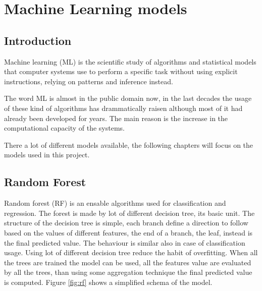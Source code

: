 \documentclass[%
    corpo=12pt,
    twoside,
    oldstyle,
    autoretitolo,
    greek,
    evenboxes,
]{toptesi}
\begin{document}

\chapter{Machine Learning models}

\section{Introduction}
Machine learning (ML) is the scientific study of algorithms and statistical models that computer systems use to perform a specific task without using explicit instructions, relying on patterns and inference instead.\cite{ml}

The word ML is almost in the public domain now, in the last decades the usage of these kind of algorithms has drammatically raisen although most of it had already been developed for years. The main reason is the increase in the computational capacity of the systems.

There a lot of different models available, the following chapters will focus on the models used in this project.

\section{Random Forest}
Random forest (RF) is an ensable algorithms used for classification and regression. The forest is made by lot of different decision tree, its basic unit. The structure of the decision tree is simple, each branch define a direction to follow based on the values of different features, the end of a branch, the leaf, instead is the final predicted value. The behaviour is similar also in case of classification usage. Using lot of different decision tree reduce the habit of overfitting. When all the trees are trained the model can be used, all the features value are evaluated by all the trees, than using some aggregation technique the final predicted value is computed. Figure \ref{fig:rf} shows a simplified schema of the model.\\
\end{document}
